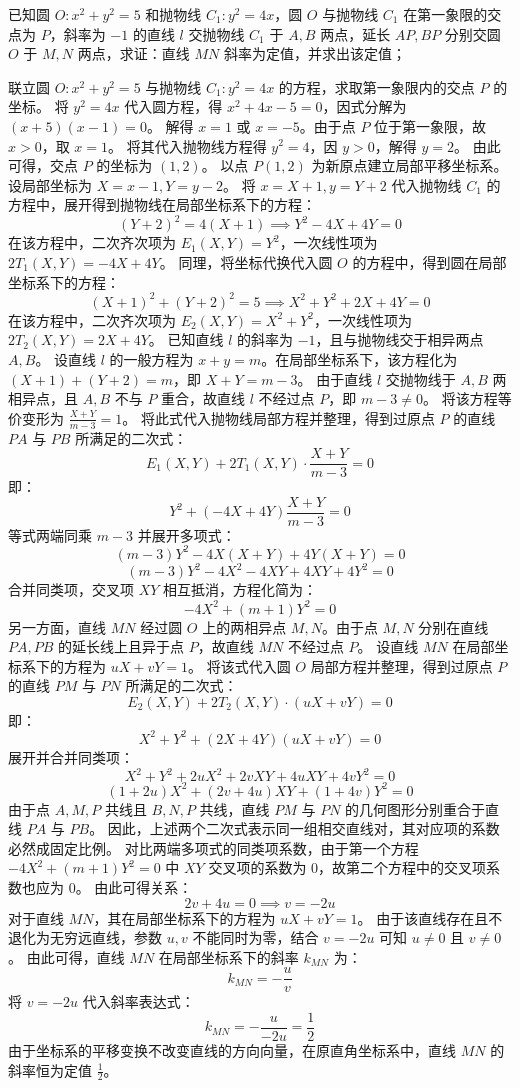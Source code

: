 \begin{example}
 已知圆 \(O: x^2 + y^2 = 5\) 和抛物线 \(C_1: y^2 = 4x\)，圆 \(O\) 与抛物线 \(C_1\) 在第一象限的交点为 \(P\)，斜率为 \(-1\) 的直线 \(l\) 交抛物线 \(C_1\) 于 \(A,B\) 两点，延长 \(AP,BP\) 分别交圆 \(O\) 于 \(M,N\) 两点，求证：直线 \(MN\) 斜率为定值，并求出该定值；
\end{example}
\begin{solution}
联立圆 $O: x^2 + y^2 = 5$ 与抛物线 $C_1: y^2 = 4x$ 的方程，求取第一象限内的交点 $P$ 的坐标。
将 $y^2 = 4x$ 代入圆方程，得 $x^2 + 4x - 5 = 0$，因式分解为 $(x+5)(x-1) = 0$。
解得 $x = 1$ 或 $x = -5$。由于点 $P$ 位于第一象限，故 $x > 0$，取 $x = 1$。
将其代入抛物线方程得 $y^2 = 4$，因 $y > 0$，解得 $y = 2$。
由此可得，交点 $P$ 的坐标为 $(1, 2)$。
以点 $P(1, 2)$ 为新原点建立局部平移坐标系。设局部坐标为 $X = x - 1, Y = y - 2$。
将 $x = X + 1, y = Y + 2$ 代入抛物线 $C_1$ 的方程中，展开得到抛物线在局部坐标系下的方程：
$$ (Y + 2)^2 = 4(X + 1) \implies Y^2 - 4X + 4Y = 0 $$
在该方程中，二次齐次项为 $E_1(X, Y) = Y^2$，一次线性项为 $2T_1(X, Y) = -4X + 4Y$。
同理，将坐标代换代入圆 $O$ 的方程中，得到圆在局部坐标系下的方程：
$$ (X + 1)^2 + (Y + 2)^2 = 5 \implies X^2 + Y^2 + 2X + 4Y = 0 $$
在该方程中，二次齐次项为 $E_2(X, Y) = X^2 + Y^2$，一次线性项为 $2T_2(X, Y) = 2X + 4Y$。
已知直线 $l$ 的斜率为 $-1$，且与抛物线交于相异两点 $A, B$。
设直线 $l$ 的一般方程为 $x + y = m$。在局部坐标系下，该方程化为 $(X + 1) + (Y + 2) = m$，即 $X + Y = m - 3$。
由于直线 $l$ 交抛物线于 $A, B$ 两相异点，且 $A, B$ 不与 $P$ 重合，故直线 $l$ 不经过点 $P$，即 $m - 3 \neq 0$。
将该方程等价变形为 $\frac{X + Y}{m - 3} = 1$。
将此式代入抛物线局部方程并整理，得到过原点 $P$ 的直线 $PA$ 与 $PB$ 所满足的二次式：
$$ E_1(X, Y) + 2T_1(X, Y) \cdot \frac{X + Y}{m - 3} = 0 $$
即：
$$ Y^2 + (-4X + 4Y)\frac{X + Y}{m - 3} = 0 $$
等式两端同乘 $m - 3$ 并展开多项式：
$$ (m - 3)Y^2 - 4X(X + Y) + 4Y(X + Y) = 0 $$
$$ (m - 3)Y^2 - 4X^2 - 4XY + 4XY + 4Y^2 = 0 $$
合并同类项，交叉项 $XY$ 相互抵消，方程化简为：
$$ -4X^2 + (m + 1)Y^2 = 0 $$
另一方面，直线 $MN$ 经过圆 $O$ 上的两相异点 $M, N$。由于点 $M, N$ 分别在直线 $PA, PB$ 的延长线上且异于点 $P$，故直线 $MN$ 不经过点 $P$。
设直线 $MN$ 在局部坐标系下的方程为 $uX + vY = 1$。
将该式代入圆 $O$ 局部方程并整理，得到过原点 $P$ 的直线 $PM$ 与 $PN$ 所满足的二次式：
$$ E_2(X, Y) + 2T_2(X, Y) \cdot (uX + vY) = 0 $$
即：
$$ X^2 + Y^2 + (2X + 4Y)(uX + vY) = 0 $$
展开并合并同类项：
$$ X^2 + Y^2 + 2uX^2 + 2vXY + 4uXY + 4vY^2 = 0 $$
$$ (1 + 2u)X^2 + (2v + 4u)XY + (1 + 4v)Y^2 = 0 $$
由于点 $A, M, P$ 共线且 $B, N, P$ 共线，直线 $PM$ 与 $PN$ 的几何图形分别重合于直线 $PA$ 与 $PB$。
因此，上述两个二次式表示同一组相交直线对，其对应项的系数必然成固定比例。
对比两端多项式的同类项系数，由于第一个方程 $-4X^2 + (m + 1)Y^2 = 0$ 中 $XY$ 交叉项的系数为 $0$，故第二个方程中的交叉项系数也应为 $0$。
由此可得关系：
$$ 2v + 4u = 0 \implies v = -2u $$
对于直线 $MN$，其在局部坐标系下的方程为 $uX + vY = 1$。
由于该直线存在且不退化为无穷远直线，参数 $u, v$ 不能同时为零，结合 $v = -2u$ 可知 $u \neq 0$ 且 $v \neq 0$。
由此可得，直线 $MN$ 在局部坐标系下的斜率 $k_{MN}$ 为：
$$ k_{MN} = -\frac{u}{v} $$
将 $v = -2u$ 代入斜率表达式：
$$ k_{MN} = -\frac{u}{-2u} = \frac{1}{2} $$
由于坐标系的平移变换不改变直线的方向向量，在原直角坐标系中，直线 $MN$ 的斜率恒为定值 $\frac{1}{2}$。


\end{solution}

